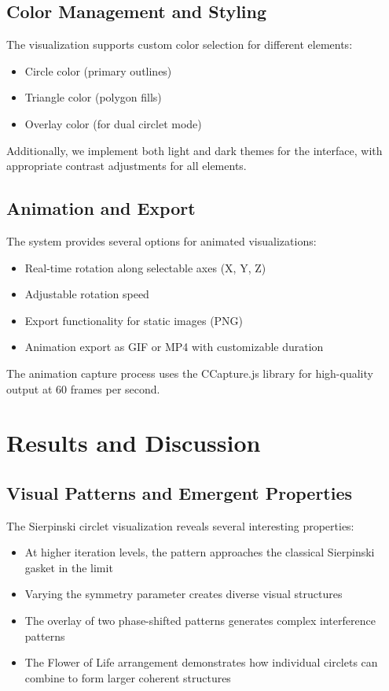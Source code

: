 \documentclass[12pt,a4paper]{article}
\begin{document}
\subsection{Color Management and Styling}
The visualization supports custom color selection for different elements:

\begin{itemize}
    \item Circle color (primary outlines)
    \item Triangle color (polygon fills)
    \item Overlay color (for dual circlet mode)
\end{itemize}

Additionally, we implement both light and dark themes for the interface, with appropriate contrast adjustments for all elements.

\subsection{Animation and Export}
The system provides several options for animated visualizations:

\begin{itemize}
    \item Real-time rotation along selectable axes (X, Y, Z)
    \item Adjustable rotation speed
    \item Export functionality for static images (PNG)
    \item Animation export as GIF or MP4 with customizable duration
\end{itemize}

The animation capture process uses the CCapture.js library for high-quality output at 60 frames per second.

\section{Results and Discussion}

\subsection{Visual Patterns and Emergent Properties}
The Sierpinski circlet visualization reveals several interesting properties:

\begin{itemize}
    \item At higher iteration levels, the pattern approaches the classical Sierpinski gasket in the limit
    \item Varying the symmetry parameter creates diverse visual structures
    \item The overlay of two phase-shifted patterns generates complex interference patterns
    \item The Flower of Life arrangement demonstrates how individual circlets can combine to form larger coherent structures
\end{itemize}
\end{document}
